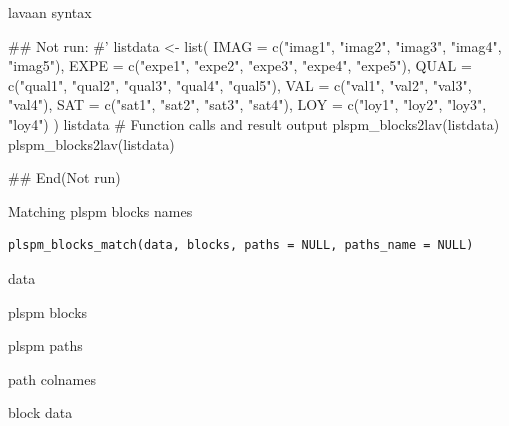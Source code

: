 \documentclass[a4paper]{book}
\begin{document}
%
\begin{Value}
lavaan syntax
\end{Value}
%
\begin{Examples}
\begin{ExampleCode}

\#\# Not run: 
#'
listdata <- list(
  IMAG = c("imag1", "imag2", "imag3", "imag4", "imag5"),
  EXPE = c("expe1", "expe2", "expe3", "expe4", "expe5"),
  QUAL = c("qual1", "qual2", "qual3", "qual4", "qual5"),
  VAL = c("val1", "val2", "val3", "val4"),
  SAT = c("sat1", "sat2", "sat3", "sat4"),
  LOY = c("loy1", "loy2", "loy3", "loy4")
)
listdata
# Function calls and result output
plspm_blocks2lav(listdata)
plspm_blocks2lav(listdata)%

## End(Not run)

\end{ExampleCode}
\end{Examples}
%
\begin{Description}
Matching plspm blocks names
\end{Description}
%
\begin{Usage}
\begin{verbatim}
plspm_blocks_match(data, blocks, paths = NULL, paths_name = NULL)
\end{verbatim}
\end{Usage}
%
\begin{Arguments}
\begin{ldescription}
\item[\code{data}] data

\item[\code{blocks}] plspm blocks

\item[\code{paths}] plspm paths

\item[\code{paths\_name}] path colnames
\end{ldescription}
\end{Arguments}
%
\begin{Value}
block data
\end{Value}
%
\end{document}
